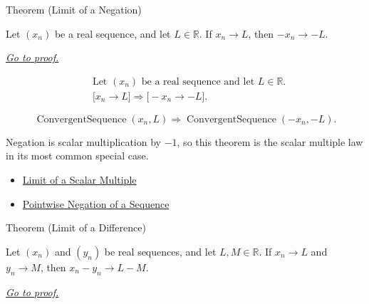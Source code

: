 \begin{theorembox}{Theorem (Limit of a Negation)}
\begin{theorem}
\label{thm:limit-of-a-negation}
Let $(x_n)$ be a real sequence, and let $L\in\mathbb{R}$. If $x_n\to L$,
then $-x_n\to -L$.

\smallskip
\noindent
\hyperref[prf:limit-of-a-negation]{\textit{Go to proof.}}
\end{theorem}
\end{theorembox}

\begin{remark*}
\[
\begin{aligned}
&\text{Let } (x_n) \text{ be a real sequence and let } L\in\mathbb{R}.\\
&\bigl[x_n\to L\bigr]
\Longrightarrow
\bigl[-x_n\to -L\bigr].
\end{aligned}
\]
\end{remark*}

\begin{remark*}
\[
\operatorname{ConvergentSequence}(x_n,L)
\Longrightarrow
\operatorname{ConvergentSequence}(-x_n,-L).
\]
\end{remark*}

\begin{remark*}[Interpretation]
Negation is scalar multiplication by $-1$, so this theorem is the scalar
multiple law in its most common special case.
\end{remark*}

\begin{dependencies}
\begin{itemize}
  \item \hyperref[thm:limit-of-scalar-multiple]{Limit of a Scalar Multiple}
  \item \hyperref[def:pointwise-negation-sequence]{Pointwise Negation of a Sequence}
\end{itemize}
\end{dependencies}


\begin{theorembox}{Theorem (Limit of a Difference)}
\begin{theorem}
\label{thm:limit-of-a-difference}
Let $(x_n)$ and $(y_n)$ be real sequences, and let $L,M\in\mathbb{R}$.
If $x_n\to L$ and $y_n\to M$, then $x_n-y_n\to L-M$.

\smallskip
\noindent
\hyperref[prf:limit-of-a-difference]{\textit{Go to proof.}}
\end{theorem}
\end{theorembox}

